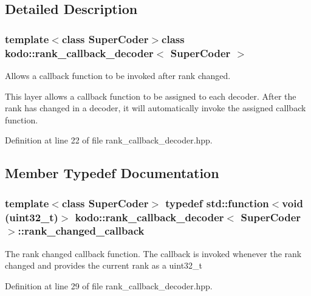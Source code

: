\subsection{Detailed Description}
\subsubsection*{template$<$class Super\-Coder$>$class kodo\-::rank\-\_\-callback\-\_\-decoder$<$ Super\-Coder $>$}

Allows a callback function to be invoked after rank changed. 

This layer allows a callback function to be assigned to each decoder. After the rank has changed in a decoder, it will automatically invoke the assigned callback function. 

Definition at line 22 of file rank\-\_\-callback\-\_\-decoder.\-hpp.



\subsection{Member Typedef Documentation}
\hypertarget{classkodo_1_1rank__callback__decoder_a44bad0740473037f1e3f6a32dec28db9}{
\subsubsection[{rank\-\_\-changed\-\_\-callback}]{\setlength{\rightskip}{0pt plus 5cm}template$<$class Super\-Coder$>$ typedef std\-::function$<$void (uint32\-\_\-t)$>$ {\bf kodo\-::rank\-\_\-callback\-\_\-decoder}$<$ Super\-Coder $>$\-::{\bf rank\-\_\-changed\-\_\-callback}}}\label{classkodo_1_1rank__callback__decoder_a44bad0740473037f1e3f6a32dec28db9}
The rank changed callback function. The callback is invoked whenever the rank changed and provides the current rank as a uint32\-\_\-t 

Definition at line 29 of file rank\-\_\-callback\-\_\-decoder.\-hpp.



